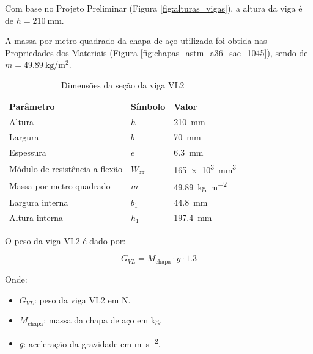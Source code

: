 Com base no Projeto Preliminar (Figura \ref{fig:alturas_vigas}), a altura da viga é de $h = \SI{210}{\milli\meter}$.

A massa por metro quadrado da chapa de aço utilizada foi obtida nas Propriedades dos Materiais (Figura \ref{fig:chapas_astm_a36_sae_1045}), sendo de $m = \SI{49.89}{\kilo\gram\per\meter^2}$.

\begin{table}[H]
  \centering
  \caption{Dimensões da seção da viga VL2}
  \label{tab:dimensoes_vl2}
  \begin{tabularx}{\textwidth}{>{\centering\arraybackslash}X>{\centering\arraybackslash}X>{\centering\arraybackslash}X}
    \toprule
    Parâmetro                      & Símbolo  & Valor                              \\
    \midrule
    Altura                         & $h$      & \SI{210}{\milli\meter}             \\
    Largura                        & $b$      & \SI{70}{\milli\meter}              \\
    Espessura                      & $e$      & \SI{6.3}{\milli\meter}             \\
    Módulo de resistência a flexão & $W_{zz}$ & \SI{165e3}{\milli\meter^3}         \\
    Massa por metro quadrado       & $m$      & \SI{49.89}{\kilo\gram\per\meter^2} \\
    Largura interna                & $b_1$    & \SI{44.8}{\milli\meter}            \\
    Altura interna                 & $h_1$    & \SI{197.4}{\milli\meter}           \\
    \bottomrule
  \end{tabularx}
\end{table}

O peso da viga VL2 é dado por:

\begin{equation}
  G_{VL} = M_{\text{chapa}} \cdot g \cdot \num{1.3}
  \label{eq:g_vl2}
\end{equation}

Onde:

\begin{itemize}
  \item $G_{VL}$: peso da viga VL2 em \si{\newton}.
  \item $M_{\text{chapa}}$: massa da chapa de aço em \si{\kilo\gram}.
  \item $g$: aceleração da gravidade em \si{\meter\per\second^2}.
\end{itemize}

